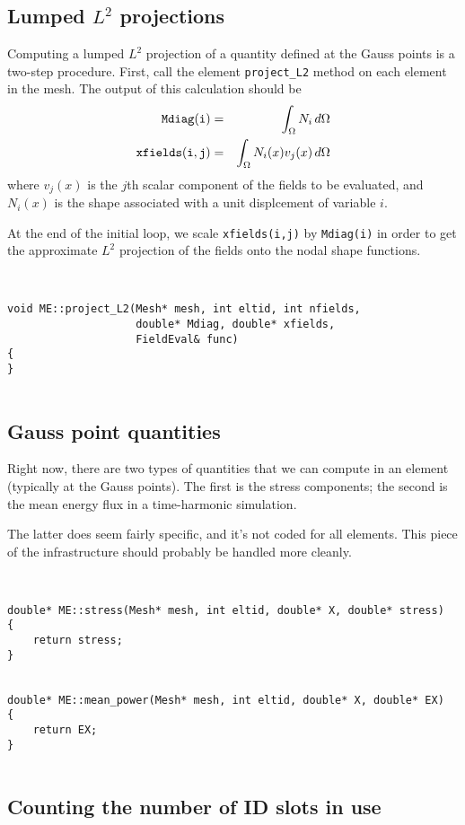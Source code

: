 \subsection{Lumped $L^2$ projections}

Computing a lumped $L^2$ projection of a quantity defined at the
Gauss points is a two-step procedure.  First, call the element
{\tt project\_L2} method on each element in the mesh.  The output
of this calculation should be
\begin{eqnarray*}
{\tt Mdiag(i)} & = & \int_{\Omega} N_i \, d\Omega \\
{\tt xfields(i,j)} & = & \int_{\Omega} N_i(x) v_j(x) \, d\Omega \\
\end{eqnarray*}
where $v_j(x)$ is the $j$th scalar component of the fields to be
evaluated, and $N_i(x)$ is the shape associated with a unit displcement
of variable $i$.

At the end of the initial loop, we scale {\tt xfields(i,j)} by
{\tt Mdiag(i)} in order to get the approximate $L^2$ projection of
the fields onto the nodal shape functions.
\begin{verbatim}


void ME::project_L2(Mesh* mesh, int eltid, int nfields,
                    double* Mdiag, double* xfields,
                    FieldEval& func)
{
}


\end{verbatim}
\subsection{Gauss point quantities}

Right now, there are two types of quantities that we can compute in
an element (typically at the Gauss points).  The first is the
stress components; the second is the mean energy flux in a
time-harmonic simulation.

The latter does seem fairly specific, and it's not coded for all
elements.  This piece of the infrastructure should probably be
handled more cleanly.

\begin{verbatim}


double* ME::stress(Mesh* mesh, int eltid, double* X, double* stress)
{
    return stress;
}


double* ME::mean_power(Mesh* mesh, int eltid, double* X, double* EX)
{
    return EX;
}


\end{verbatim}
\subsection{Counting the number of ID slots in use}

